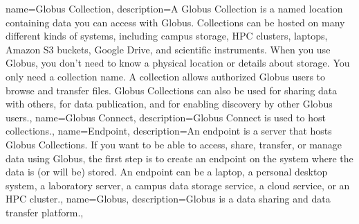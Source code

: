 { name={Globus Collection},
  description={A Globus Collection is a named location containing data you 
can access with Globus. Collections can be hosted on many different 
kinds of systems, including campus storage, HPC clusters, laptops, 
Amazon S3 buckets, Google Drive, and scientific instruments. 
When you use Globus, you don’t need to know a physical location 
or details about storage. You only need a collection name. 
A collection allows authorized Globus users to browse and 
transfer files. Globus Collections can also be used for sharing data 
with others, for data publication, and for enabling discovery by other Globus users.},
}
{ name={Globus Connect},
  description={Globus Connect is used to host collections.},
}
{ name={Endpoint},
  description={An endpoint is a server that hosts Globus Collections. 
If you want to be able to access, share, transfer, or manage 
data using Globus, the first step is to create an endpoint 
on the system where the data is (or will be) stored. An endpoint 
can be a laptop, a personal desktop system, a laboratory 
server, a campus data storage service, a cloud service, or an HPC cluster.},
}
{ name={Globus},
  description={Globus is a data sharing and data transfer platform.},
}

